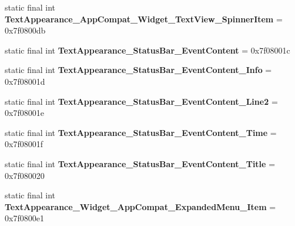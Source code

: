 \begin{DoxyCompactItemize}
\item 
\hypertarget{classandroid_1_1support_1_1v7_1_1appcompat_1_1_r_1_1style_a7122ada05dc3c4ad71c8ed067b0bf22e}{}static final int {\bfseries Text\+Appearance\+\_\+\+App\+Compat\+\_\+\+Widget\+\_\+\+Text\+View\+\_\+\+Spinner\+Item} = 0x7f0800db\label{classandroid_1_1support_1_1v7_1_1appcompat_1_1_r_1_1style_a7122ada05dc3c4ad71c8ed067b0bf22e}

\item 
\hypertarget{classandroid_1_1support_1_1v7_1_1appcompat_1_1_r_1_1style_a45e86f61454f8ebea874b3510c156088}{}static final int {\bfseries Text\+Appearance\+\_\+\+Status\+Bar\+\_\+\+Event\+Content} = 0x7f08001c\label{classandroid_1_1support_1_1v7_1_1appcompat_1_1_r_1_1style_a45e86f61454f8ebea874b3510c156088}

\item 
\hypertarget{classandroid_1_1support_1_1v7_1_1appcompat_1_1_r_1_1style_a51821eaa8d46d767b779201438f7a60d}{}static final int {\bfseries Text\+Appearance\+\_\+\+Status\+Bar\+\_\+\+Event\+Content\+\_\+\+Info} = 0x7f08001d\label{classandroid_1_1support_1_1v7_1_1appcompat_1_1_r_1_1style_a51821eaa8d46d767b779201438f7a60d}

\item 
\hypertarget{classandroid_1_1support_1_1v7_1_1appcompat_1_1_r_1_1style_afeb41d7f55218369d42d124e38bdf88f}{}static final int {\bfseries Text\+Appearance\+\_\+\+Status\+Bar\+\_\+\+Event\+Content\+\_\+\+Line2} = 0x7f08001e\label{classandroid_1_1support_1_1v7_1_1appcompat_1_1_r_1_1style_afeb41d7f55218369d42d124e38bdf88f}

\item 
\hypertarget{classandroid_1_1support_1_1v7_1_1appcompat_1_1_r_1_1style_a52296737aad32af06c98357b2616fb96}{}static final int {\bfseries Text\+Appearance\+\_\+\+Status\+Bar\+\_\+\+Event\+Content\+\_\+\+Time} = 0x7f08001f\label{classandroid_1_1support_1_1v7_1_1appcompat_1_1_r_1_1style_a52296737aad32af06c98357b2616fb96}

\item 
\hypertarget{classandroid_1_1support_1_1v7_1_1appcompat_1_1_r_1_1style_a066629ed4a8da87c885a0cbfbd6e3db5}{}static final int {\bfseries Text\+Appearance\+\_\+\+Status\+Bar\+\_\+\+Event\+Content\+\_\+\+Title} = 0x7f080020\label{classandroid_1_1support_1_1v7_1_1appcompat_1_1_r_1_1style_a066629ed4a8da87c885a0cbfbd6e3db5}

\item 
\hypertarget{classandroid_1_1support_1_1v7_1_1appcompat_1_1_r_1_1style_af4b9716161695143ddd2776e7821bfd3}{}static final int {\bfseries Text\+Appearance\+\_\+\+Widget\+\_\+\+App\+Compat\+\_\+\+Expanded\+Menu\+\_\+\+Item} = 0x7f0800e1\label{classandroid_1_1support_1_1v7_1_1appcompat_1_1_r_1_1style_af4b9716161695143ddd2776e7821bfd3}


\end{DoxyCompactItemize}
